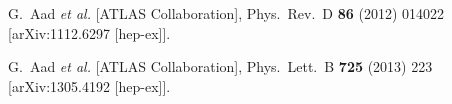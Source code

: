 \documentclass[11pt]{article}
\begin{document}
\clearpage
\begin{thebibliography}{1}
  G.~Aad {\it et al.}  [ATLAS Collaboration],
  Phys.\ Rev.\ D {\bf 86} (2012) 014022
  [arXiv:1112.6297 [hep-ex]].
  
  G.~Aad {\it et al.}  [ATLAS Collaboration],
  Phys.\ Lett.\ B {\bf 725} (2013) 223
  [arXiv:1305.4192 [hep-ex]].

\end{thebibliography}
\end{document}
